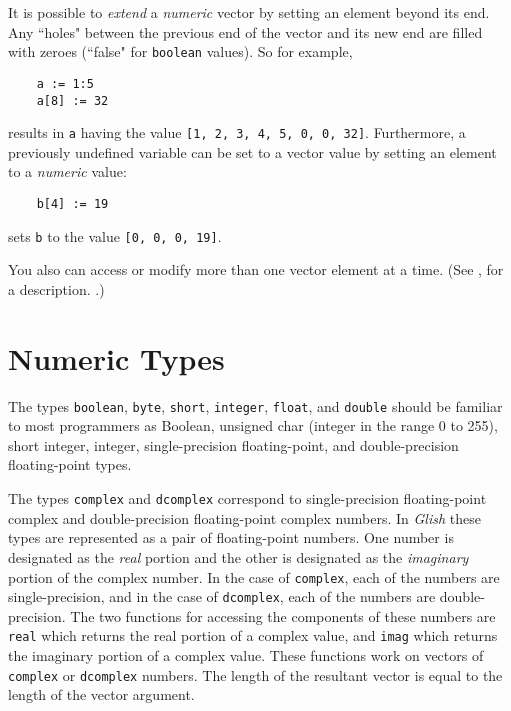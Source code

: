 It is possible
to {\em extend} a {\em numeric} vector
by setting an element beyond
its end.  Any ``holes"
between the previous end of the vector and its new
end are filled with zeroes (``false" for {\tt boolean} values).  So
for example,
\begin{verbatim}
    a := 1:5
    a[8] := 32
\end{verbatim}
results in {\tt a} having the value {\tt [1, 2, 3, 4, 5, 0, 0, 32]}.
Furthermore, a previously undefined variable can be set to a vector
value by setting an element to a {\em numeric} value:
\begin{verbatim}
    b[4] := 19
\end{verbatim}
sets {\tt b} to the value {\tt [0, 0, 0, 19]}.

You also can access or modify more than one vector
element at a time. (See , for a description.
.)

\section{Numeric Types}
\label{first-type}

The types 
{\tt boolean}, {\tt byte}, {\tt short}, {\tt integer},
{\tt float}, and {\tt double} 
should be familiar to most programmers as Boolean, unsigned char (integer
in the range 0 to 255), short integer, integer,
single-precision floating-point, and double-precision floating-point types.

The types 
\label{complex-types}
{\tt complex} and {\tt dcomplex}  correspond to single-precision
floating-point complex and double-precision floating-point complex numbers.
In {\em Glish} these types are represented  as a pair of floating-point numbers.
One number is designated as the {\em real} portion and the other is
designated as the {\em imaginary} portion of the complex number. In the
case of {\tt complex}, each of the numbers are single-precision,
and in the case of {\tt dcomplex}, each of the numbers are double-precision.
The two functions for accessing the components of these numbers are
{\tt real} which returns the real portion of a complex value, and
{\tt imag} which returns the imaginary portion of a complex value. These functions
work on vectors of {\tt complex} or {\tt dcomplex} numbers. The length of the
resultant vector is equal to the length of the vector argument.

